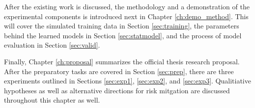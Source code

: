 After the existing work is discussed, the methodology and a demonstration of
the experimental components is introduced next in Chapter \ref{ch:demo_method}.
This will cover the simulated training data in Section \ref{sec:training}, the
parameters behind the learned models in Section \ref{sec:statmodel}, and the
process of model evaluation in Section \ref{sec:valid}.  

Finally, Chapter \ref{ch:proposal} summarizes the official thesis research
proposal. After the preparatory tasks are covered in Section \ref{sec:prep},
there are three experiments outlined in Sections \ref{sec:exp1},
\ref{sec:exp2}, and \ref{sec:exp3}. Qualitiative hypotheses as well as
alternative directions for risk mitgation are discussed throughout this
chapter as well. 
